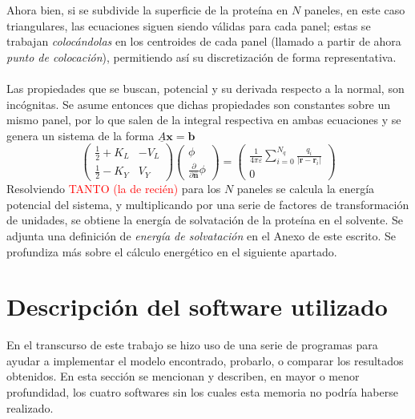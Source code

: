 \documentclass[12pt, oneside, numbers, spanish]{ezthesis}
\numberwithin{equation}{section}
\begin{document}
Ahora bien, si se subdivide la superficie de la proteína en $N$ paneles, en este caso triangulares, las ecuaciones siguen siendo válidas para cada panel; estas se trabajan \textit{colocándolas} en los centroides de cada panel (llamado a partir de ahora \textit{punto de colocación}), permitiendo así su discretización de forma representativa.\\\\
Las propiedades que se buscan, potencial y su derivada respecto a la normal, son incógnitas. Se asume entonces que dichas propiedades son constantes sobre un mismo panel, por lo que salen de la integral respectiva en ambas ecuaciones y se genera un sistema de la forma $\underline{A}\mathbf{x} = \mathbf{b}$
\begin{equation}
	\renewcommand\arraystretch{1.6}
	\begin{pmatrix}
		\frac{1}{2} + K_L & -V_L \\ \frac{1}{2} - K_Y & V_Y
	\end{pmatrix}
	\begin{pmatrix}
		\phi \\ \frac{\partial}{\partial\hat{\mathbf{n}}}\phi
	\end{pmatrix}
	=
	\begin{pmatrix}
		\frac{1}{4\pi\varepsilon}\sum_{i=0}^{N_q}\frac{q_i}{|\mathbf{r} - \mathbf{r}_i|} \\ 0
	\end{pmatrix}
\end{equation}
Resolviendo \textcolor{red}{TANTO (la de recién)} para los $N$ paneles se calcula la energía potencial del sistema, y multiplicando por una serie de factores de transformación de unidades, se obtiene la energía de solvatación de la proteína en el solvente. Se adjunta una definición de \textit{energía de solvatación} en el Anexo de este escrito. Se profundiza más sobre el cálculo energético en el siguiente apartado.






\section{Descripción del software utilizado}
En el transcurso de este trabajo se hizo uso de una serie de programas para ayudar a implementar el modelo encontrado, probarlo, o comparar los resultados obtenidos. En esta sección se mencionan y describen, en mayor o menor profundidad, los cuatro softwares sin los cuales esta memoria no podría haberse realizado.
\end{document}
